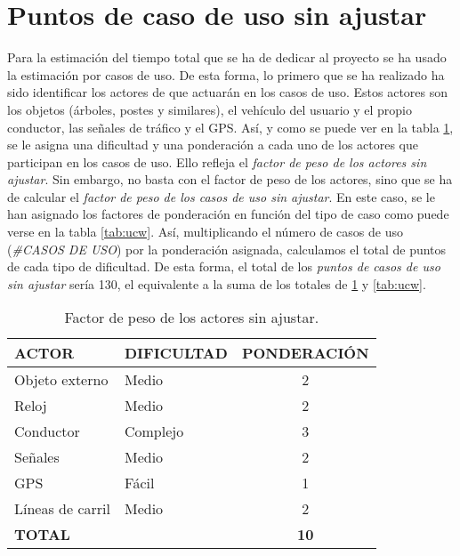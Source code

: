 \section{Puntos de caso de uso sin ajustar}

\par Para la estimación del tiempo total que se ha de dedicar al proyecto se ha usado la estimación por casos de uso. De esta forma, lo primero que se ha realizado ha sido identificar los actores de que actuarán en los casos de uso. Estos actores son los objetos (árboles, postes y similares), el vehículo del usuario y el propio conductor, las señales de tráfico y el GPS. Así, y como se puede ver en la tabla \ref{tab:uaw}, se le asigna una dificultad y una ponderación a cada uno de los actores que participan en los casos de uso. Ello refleja el \textit{factor de peso de los actores sin ajustar}. Sin embargo, no basta con el factor de peso de los actores, sino que se ha de calcular el \textit{factor de peso de los casos de uso sin ajustar}. En este caso, se le han asignado los factores de ponderación en función del tipo de caso como puede verse en la tabla \ref{tab:ucw}. Así, multiplicando el número de casos de uso (\textit{\#CASOS DE USO}) por la ponderación asignada, calculamos el total de puntos de cada tipo de dificultad. De esta forma, el total de los \textit{puntos de casos de uso sin ajustar} sería 130, el equivalente a la suma de los totales de \ref{tab:uaw} y \ref{tab:ucw}.

\begin{table}[H]
\begin{center}
\begin{tabular}{l l c}
\textbf{ACTOR} & \textbf{DIFICULTAD} & \textbf{PONDERACIÓN}\\ \hline \hline
Objeto externo & Medio & 2  \\
Reloj & Medio & 2\\
Conductor & Complejo & 3\\
Señales & Medio & 2\\
GPS & Fácil & 1\\
Líneas de carril & Medio & 2 \\ \hline
\textbf{TOTAL} &  & \textbf{10}\\ \hline \hline
\end{tabular}
\caption{Factor de peso de los actores sin ajustar.}
\label{tab:uaw}
\end{center}
\end{table}


